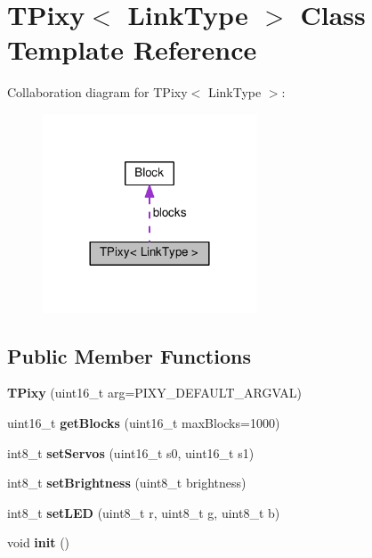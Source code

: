 \hypertarget{class_t_pixy}{}\section{T\+Pixy$<$ Link\+Type $>$ Class Template Reference}
\label{class_t_pixy}


Collaboration diagram for T\+Pixy$<$ Link\+Type $>$\+:
\nopagebreak
\begin{figure}[H]
\begin{center}
\leavevmode
\includegraphics[width=180pt]{class_t_pixy__coll__graph}
\end{center}
\end{figure}
\subsection*{Public Member Functions}
\begin{DoxyCompactItemize}
\item 
{\bfseries T\+Pixy} (uint16\+\_\+t arg=P\+I\+X\+Y\+\_\+\+D\+E\+F\+A\+U\+L\+T\+\_\+\+A\+R\+G\+V\+AL)\hypertarget{class_t_pixy_a6d28834f2de08fc0dd514e854d91c963}{}\label{class_t_pixy_a6d28834f2de08fc0dd514e854d91c963}

\item 
uint16\+\_\+t {\bfseries get\+Blocks} (uint16\+\_\+t max\+Blocks=1000)\hypertarget{class_t_pixy_adea9ba4b37f132747ced41d1a398171b}{}\label{class_t_pixy_adea9ba4b37f132747ced41d1a398171b}

\item 
int8\+\_\+t {\bfseries set\+Servos} (uint16\+\_\+t s0, uint16\+\_\+t s1)\hypertarget{class_t_pixy_a8d768d7d679742d487a44a6af85ccecd}{}\label{class_t_pixy_a8d768d7d679742d487a44a6af85ccecd}

\item 
int8\+\_\+t {\bfseries set\+Brightness} (uint8\+\_\+t brightness)\hypertarget{class_t_pixy_a8c9f442eff27c2fd563da0df9d397d42}{}\label{class_t_pixy_a8c9f442eff27c2fd563da0df9d397d42}

\item 
int8\+\_\+t {\bfseries set\+L\+ED} (uint8\+\_\+t r, uint8\+\_\+t g, uint8\+\_\+t b)\hypertarget{class_t_pixy_a938f7b3d42778ecf8bff8f6eb58ff1c8}{}\label{class_t_pixy_a938f7b3d42778ecf8bff8f6eb58ff1c8}

\item 
void {\bfseries init} ()\hypertarget{class_t_pixy_a9cfbacc18dd014a52926a0239927e29a}{}\label{class_t_pixy_a9cfbacc18dd014a52926a0239927e29a}

\end{DoxyCompactItemize}
